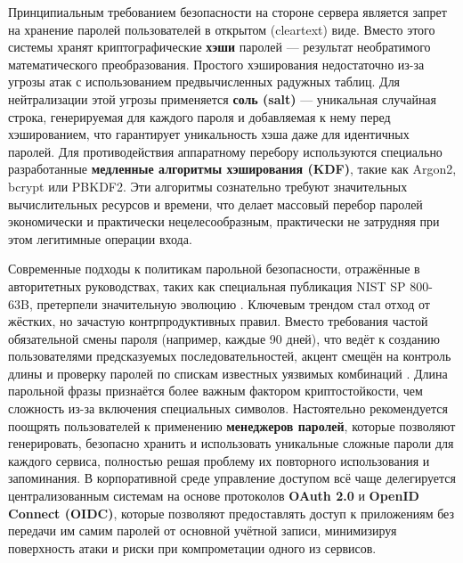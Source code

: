 \documentclass{SibFU-docs}
\begin{document}

Принципиальным требованием безопасности на стороне сервера является запрет на хранение паролей пользователей в открытом (cleartext) виде. Вместо этого системы хранят криптографические \textbf{хэши} паролей — результат необратимого математического преобразования. Простого хэширования недостаточно из-за угрозы атак с использованием предвычисленных радужных таблиц. Для нейтрализации этой угрозы применяется \textbf{соль (salt)} — уникальная случайная строка, генерируемая для каждого пароля и добавляемая к нему перед хэшированием, что гарантирует уникальность хэша даже для идентичных паролей. Для противодействия аппаратному перебору используются специально разработанные \textbf{медленные алгоритмы хэширования (KDF)}, такие как Argon2, bcrypt или PBKDF2. Эти алгоритмы сознательно требуют значительных вычислительных ресурсов и времени, что делает массовый перебор паролей экономически и практически нецелесообразным, практически не затрудняя при этом легитимные операции входа.


Современные подходы к политикам парольной безопасности, отражённые в авторитетных руководствах, таких как специальная публикация NIST SP 800-63B, претерпели значительную эволюцию \cite{nist_passwords_2024}. Ключевым трендом стал отход от жёстких, но зачастую контрпродуктивных правил. Вместо требования частой обязательной смены пароля (например, каждые 90 дней), что ведёт к созданию пользователями предсказуемых последовательностей, акцент смещён на контроль длины и проверку паролей по спискам известных уязвимых комбинаций \cite{nist_passwords_2024}. Длина парольной фразы признаётся более важным фактором криптостойкости, чем сложность из-за включения специальных символов. Настоятельно рекомендуется поощрять пользователей к применению \textbf{менеджеров паролей}, которые позволяют генерировать, безопасно хранить и использовать уникальные сложные пароли для каждого сервиса, полностью решая проблему их повторного использования и запоминания. В корпоративной среде управление доступом всё чаще делегируется централизованным системам на основе протоколов \textbf{OAuth 2.0} и \textbf{OpenID Connect (OIDC)}, которые позволяют предоставлять доступ к приложениям без передачи им самим паролей от основной учётной записи, минимизируя поверхность атаки и риски при компрометации одного из сервисов.
\end{document}
